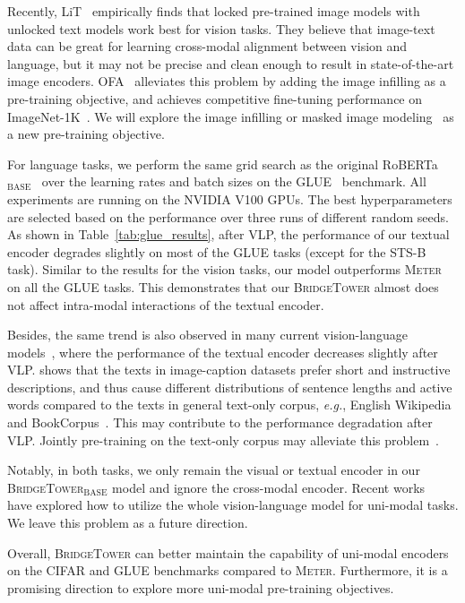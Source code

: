 \documentclass[letterpaper]{article} %
\newcommand{\methodname}[0]{\textsc{BridgeTower}}
\newcommand{\modelbase}[0]{$_{\text{BASE}}$}
\newcommand{\metername}[0]{\textsc{Meter}}
\newcommand{\eg}[0]{\textit{e.g.},}
\begin{document}
Recently, LiT~\citep{zhai2021lit} empirically finds that locked pre-trained image models with unlocked text models work best for vision tasks. They believe that image-text data can be great for learning cross-modal alignment between vision and language, but it may not be precise and clean enough to result in state-of-the-art image encoders.
OFA~\citep{wang2022OFA} alleviates this problem by adding the image infilling as a pre-training objective, and achieves competitive fine-tuning performance on ImageNet-1K~\citep{russakovsky2015imagenet}. We will explore the image infilling or masked image modeling~\citep{wang2022image} as a new pre-training objective.

For language tasks, we perform the same grid search as the original RoBERTa\modelbase{}~\citep{liu2019roberta} over the learning rates and batch sizes on the GLUE~\citep{wang2018glue} benchmark. 
All experiments are running on the NVIDIA V100 GPUs.
The best hyperparameters are selected based on the performance over three runs of different random seeds. 
As shown in Table~\ref{tab:glue_results}, after VLP, the performance of our textual encoder degrades slightly on most of the GLUE tasks (except for the STS-B task). 
Similar to the results for the vision tasks, our model outperforms \metername{} on all the GLUE tasks.
This demonstrates that our \methodname{} almost does not affect intra-modal interactions of the textual encoder.

Besides, the same trend is also observed in many current vision-language models~\citep{tan2020vokenization,dou2021meter}, where the performance of the textual encoder decreases slightly after VLP. 
\citet{tan2020vokenization} shows that the texts in image-caption datasets prefer short and instructive descriptions, and thus cause different distributions of sentence lengths and active words compared to the texts in general text-only corpus, \eg{} English Wikipedia and BookCorpus~\citep{zhu2015aligning}. This may contribute to the performance degradation after VLP. Jointly pre-training on the text-only corpus may alleviate this problem~\citep{li2021unimo}.

Notably, in both tasks, we only remain the visual or textual encoder in our \methodname{}\modelbase{} model and ignore the cross-modal encoder. Recent works~\citep{hu2021unit, singh2021flava, sileo2021visual, wang2022OFA} have explored how to utilize the whole vision-language model for uni-modal tasks. We leave this problem as a future direction.

Overall, \methodname{} can better maintain the capability of uni-modal encoders on the CIFAR and GLUE benchmarks compared to \metername{}.
Furthermore, it is a promising direction to explore more uni-modal pre-training objectives.
\end{document}
